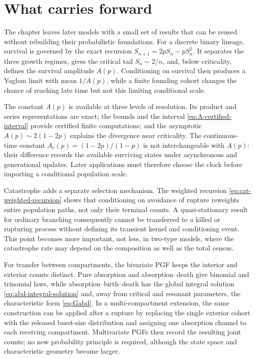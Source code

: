 \section{What carries forward}
\label{sec:chapter-synthesis}

The chapter leaves later models with a small set of results that can be reused
without rebuilding their probabilistic foundations.  For a discrete binary
lineage, survival is governed by the exact recursion
\(
  S_{n+1}=2pS_n-pS_n^2
\).  It separates the three growth regimes, gives the critical tail
\(S_n\sim2/n\), and, below criticality, defines the survival amplitude \(A(p)\).
Conditioning on survival then produces a Yaglom limit with mean \(1/A(p)\), while
a finite founding cohort changes the chance of reaching late time but not this
limiting conditional scale.

The constant \(A(p)\) is available at three levels of resolution.  Its product
and series representations are exact; the bounds and the interval
\eqref{eq:A-certified-interval} provide certified finite computations; and the
asymptotic \(A(p)\sim2(1-2p)\) explains the divergence near criticality.  The
continuous-time constant
\(
  A_{\mathrm c}(p)=(1-2p)/(1-p)
\)
is not interchangeable with \(A(p)\): their difference records the available
surviving states under asynchronous and generational updates.  Later applications
must therefore choose the clock before importing a conditional population scale.

Catastrophe adds a separate selection mechanism.  The weighted recursion
\eqref{eq:cat-weighted-recursion} shows that conditioning on avoidance of rupture
reweights entire population paths, not only their terminal counts.  A
quasi-stationary result for ordinary branching consequently cannot be transferred
to a killed or rupturing process without defining its transient kernel and
conditioning event.  This point becomes more important, not less, in two-type
models, where the catastrophe rate may depend on the composition as well as the
total census.

For transfer between compartments, the bivariate PGF keeps the interior and
exterior counts distinct.  Pure absorption and absorption--death give binomial
and trinomial laws, while absorption--birth--death has the global integral
solution \eqref{eq:abd-integral-solution} and, away from critical and resonant
parameters, the characteristic form \eqref{eq:Gabd}.  In a multi-compartment
extension, the same construction can be applied after a rupture by replacing the
single exterior cohort with the released burst-size distribution and assigning
one absorption channel to each receiving compartment.  Multivariate PGFs then
record the resulting joint counts; no new probability principle is required,
although the state space and characteristic geometry become larger.

